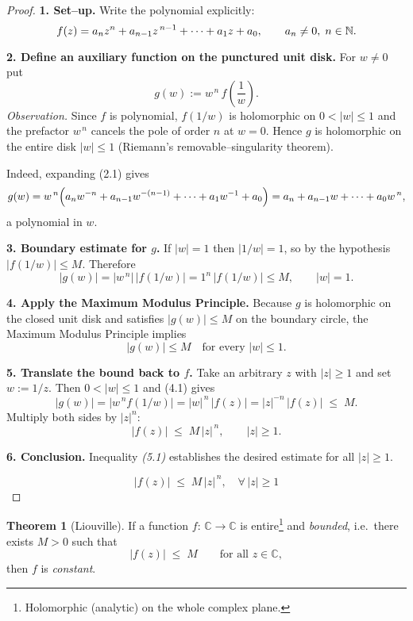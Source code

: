 \documentclass[12pt]{article}
\theoremstyle{definition} %
\newtheorem{theorem}{Theorem}
\theoremstyle{plain} %
\begin{document}
\begin{proof}
  \textbf{1.\; Set--up.}  Write the polynomial explicitly:
  \[
  f(z)=a_{n}z^{n}+a_{n-1}z^{\,n-1}+\dots+a_{1}z+a_{0},
  \qquad a_{n}\neq0,\;n\in\Bbb N.
  \]
  
  \bigskip
  \textbf{2.\; Define an auxiliary function on the punctured unit disk.}
  For $w\ne0$ put
  \[
  g(w):=w^{\,n}\,f\!\left(\frac1w\right).
  \tag{2.1}
  \]
  \textit{Observation.}  Since $f$ is polynomial, $f(1/w)$ is
  holomorphic on $0<|w|\le1$ and the prefactor $w^{\,n}$ cancels the pole
  of order $n$ at $w=0$.  Hence $g$ is holomorphic on the entire disk
  $|w|\le1$ (Riemann’s removable–singularity theorem).
  
  Indeed, expanding (2.1) gives
  \[
  g(w)
    =w^{\,n}\Bigl(a_{n}w^{-n}+a_{n-1}w^{-(n-1)}+\dots+a_{1}w^{-1}+a_{0}\Bigr)
    =a_{n}+a_{n-1}w+\dots+a_{0}w^{\,n},
  \]
  a polynomial in $w$.
  
  \bigskip
  \textbf{3.\; Boundary estimate for $g$.}
  If $|w|=1$ then $|1/w|=1$, so by the hypothesis
  $|f(1/w)|\le M$.  Therefore
  \[
  |g(w)|
    = |w^{\,n}|\,\bigl|f(1/w)\bigr|
    = 1^{n}\,|f(1/w)|
    \le M,
    \qquad |w|=1.
  \tag{3.1}
  \]
  
  \bigskip
  \textbf{4.\; Apply the Maximum Modulus Principle.}
  Because $g$ is holomorphic on the closed unit disk and satisfies
  $|g(w)|\le M$ on the boundary circle, the Maximum Modulus Principle
  implies
  \[
  |g(w)|\le M
  \quad\text{for every }|w|\le1.
  \tag{4.1}
  \]
  
  \bigskip
  \textbf{5.\; Translate the bound back to $f$.}
  Take an arbitrary $z$ with $|z|\ge1$ and set $w:=1/z$.  Then
  $0<|w|\le1$ and (4.1) gives
  \[
  |g(w)|=|w^{\,n}f(1/w)|
        =|w|^{\,n}\,|f(z)|
        =|z|^{-n}\,|f(z)|
        \;\le\; M.
  \]
  Multiply both sides by $|z|^{n}$:
  \[
  |f(z)|\;\le\; M\,|z|^{\,n},
  \qquad |z|\ge1.
  \tag{5.1}
  \]
  
  \bigskip
  \textbf{6.\; Conclusion.}  Inequality \emph{(5.1)} establishes the desired
  estimate for all $|z|\ge1$.
  
  \[
  \boxed{\;
          |f(z)|\;\le\; M\,|z|^{\,n},
          \quad\forall\,|z|\ge1
        \;}
  \]
  
  \end{proof}
  \pagebreak

\begin{theorem}[Liouville]
  If a function \(f:\,\mathbb{C} \to \mathbb{C}\) is entire\footnote{%
  Holomorphic (analytic) on the whole complex plane.}
  and \emph{bounded}, i.e.\ there exists \(M>0\) such that
  \[
  |f(z)|\;\le\;M\qquad\text{for all }z\in\mathbb{C},
  \]
  then \(f\) is \emph{constant}.
  \end{theorem}
  
\end{document}
